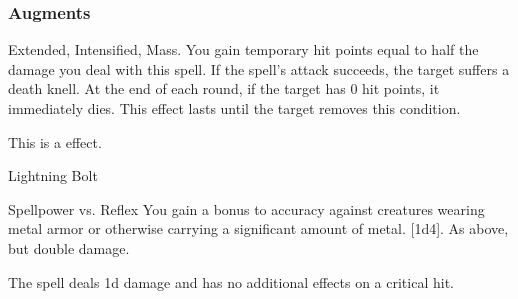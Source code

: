 \subsubsection{Augments}
 Extended, Intensified, Mass.
You gain temporary hit points equal to half the damage you deal with this spell.
If the spell's attack succeeds, the target suffers a death knell.
At the end of each round, if the target has 0 hit points, it immediately dies.
This effect lasts until the target removes this condition.
\par
This is a  effect.
\begin{spellsection}{Lightning Bolt}
\begin{spellheader}
\end{spellheader}
\begin{spellcontent}
\begin{spelltargetinginfo}
\end{spelltargetinginfo}
\begin{spelleffects}
\begin{spellattack}{Spellpower vs. Reflex}
\spellspecial You gain a  bonus to accuracy against creatures wearing metal armor or otherwise carrying a significant amount of metal.
\spellsuccess
{}[1d4].
\spellcritical As above, but double damage.
\end{spellattack}
\end{spelleffects}
\end{spellcontent}
\begin{spellfooter}
\miscastexplode
\end{spellfooter}
\begin{spellcantrip}
The spell deals \minus1d damage and has no additional effects on a critical hit.
\end{spellcantrip}
\end{spellsection}
